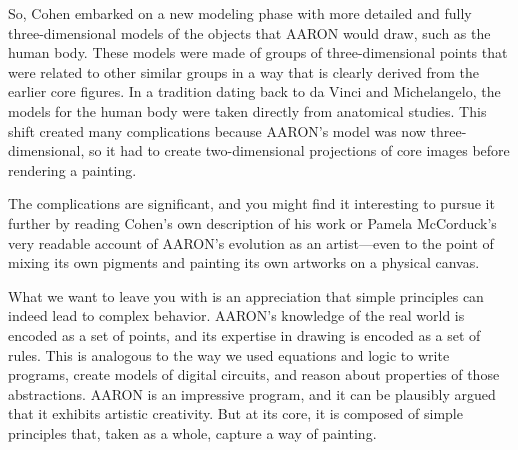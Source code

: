 So, Cohen embarked on a new modeling phase with more detailed and fully
three-dimensional models of the objects that AARON would draw, such as the human
body. These models were made of groups of three-dimensional points that were
related to other similar groups in a way that is clearly derived from the earlier
core figures. In a tradition dating back to da Vinci and Michelangelo, the models
for the human body were taken directly from anatomical studies. This shift
created many complications because AARON's model was now three-dimensional,
so it had to create two-dimensional projections of core images before rendering a
painting.

The complications are significant, and you might find it interesting to pursue
it further by reading Cohen's own description
of his work or Pamela McCorduck's
very readable account of AARON's evolution as an
artist---even to the point of mixing its own pigments and painting its own artworks
on a physical canvas.

What we want to leave you with is an appreciation that
simple principles can indeed lead to complex behavior.
AARON's knowledge of the real world is encoded as a set of points,
and its expertise in drawing is encoded as a set of rules.
This is analogous to the way we used equations and logic to write programs,
create models of digital circuits, and reason about properties of those abstractions.
AARON is an impressive program, and it can be plausibly argued that it exhibits
artistic creativity. But at its core, it is
composed of simple principles that, taken as a whole, capture a way of painting.

